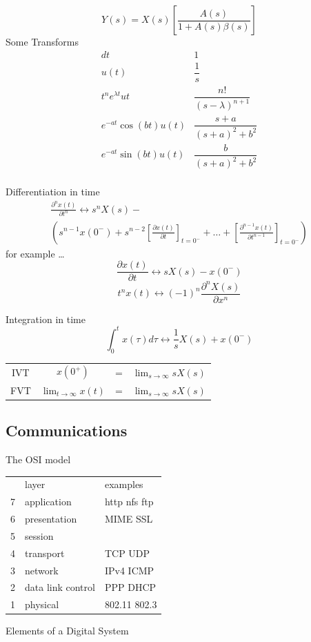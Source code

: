 \documentclass[a4paper,12pt]{article}
\begin{document}
\begin{multicols}{2}
\[Y(s) = X(s)\left[ \frac{A(s)}{1+A(s) \beta (s)}\right] \]
Some Transforms
\[
\begin{array}{cc}
d{t}&1\\
u(t)&\dfrac{1}{s}\\
t^n e^{\lambda t} u{t}& \dfrac{n!}{(s - \lambda)^{n+1}}\\
e^{-at}\cos{(bt)}u(t)& \dfrac{s+a}{(s+a)^2 + b^2}\\
e^{-at}\sin{(bt)}u(t)& \dfrac{b}{(s+a)^2 + b^2}\\
\end{array}
\]

Differentiation in time
\[
\begin{array}{l}
\frac{\partial^n x(t)}{\partial t^n} \leftrightarrow s^nX(s) - \\
\left(s^{n-1} x(0^-) + s^{n-2}\left[\frac{\partial x(t)}{\partial
t}\right]_{t=0^-}+ \ldots + \left[\frac{\partial^{n-1}x(t)}{\partial t^{n-1}}
\right]_{t=0^-}\right) \end{array}
\]
for example \ldots 
\[\frac{\partial x(t)}{\partial t} \leftrightarrow sX(s) - x(0^-)\]
\[t^nx(t) \leftrightarrow (-1)^n \frac{\partial^nX(s)}{\partial x^n}\]

Integration in time
\[
\int^t_{0} x(\tau) d\tau \leftrightarrow \frac{1}{s}X(s) +  x(0^-)
\]
\begin{tabular}{cccc}
IVT&$x(0^+)$&=&$\lim_{s \to \infty} sX(s)$\\
FVT&$\lim_{t\to \infty} x(t)$&=&$\lim_{s\to \infty} sX(s)$
\end{tabular}

\clearpage
\subsection*{Communications}
The OSI model

\begin{tabular}{cll}
&layer&examples\\
7&application&http nfs ftp\\
6&presentation&MIME SSL\\
5&session&\\
4&transport&TCP UDP\\
3&network&IPv4 ICMP\\
2&data link control&PPP DHCP\\
1&physical&802.11 802.3\\
\end{tabular}

Elements of a Digital System


\end{multicols}
\end{document}
